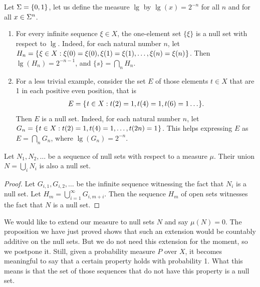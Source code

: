 \begin{examples}\label{example:null-set}
Let \( \Sigma=\{0,1\} \), let us define the measure \( \lg \) by
\( \lg(x)=2^{-n} \) for all \( n \) and for all \( x\in\Sigma^{n} \).
  \begin{enumerate}
  \item\label{i:singleton}
For every infinite sequence \( \xi\in X \), the one-element set \( \{\xi\} \) is a null set
with respect to \( \lg \).
Indeed, for each natural number \( n \), let
\( H_{n}=\mathopen\{\mskip 1mu\xi\in X: \xi(0)=\xi(0),\xi(1)=\xi(1),\dots,\xi(n)=\xi(n)\mskip 1mu\mathclose\} \).
Then \( \lg(H_{n})=2^{-n-1} \), and \( \{s\}=\bigcap_{n}H_{n} \).
\item\label{i:even-places}
For a less trivial example,
consider the set \( E \) of those elements \( t\in X \) that are 1 in each positive even
position, that is
 \begin{align*}
   E=\mathopen\{\mskip 1mu t\in X: t(2)=1,t(4)=1,t(6)=1\dots\mskip 1mu\mathclose\}.
 \end{align*}
Then \( E \) is a null set.
Indeed, for each natural number \( n \), let
\( G_{n}=\mathopen\{\mskip 1mu t\in X: t(2)=1,t(4)=1,\dots,t(2n)=1\mskip 1mu\mathclose\} \).
This helps expressing \( E \) as \( E=\bigcap_{n}G_{n} \), where \( \lg(G_{n})=2^{-n} \).
  \end{enumerate}
\end{examples}

\begin{proposition}\label{propo:infin-null-sets}
  \leanok
Let \( N_{1},N_{2},\dots \) be a sequence of null sets with respect to a measure
\( \mu \).
Their union \( N=\bigcup_{i}N_{i} \) is also a null set.
\end{proposition}
\begin{proof}
  \leanok
  Let \( G_{i,1},G_{i,2},\dots \) be the infinite sequence witnessing the fact that
\( N_{i} \) is a null set.
Let \( H_{m}=\bigcup_{i=1}^{\infty} G_{i,m+i} \).
Then the sequence \( H_{m} \) of open sets witnesses the fact that \( N \) is a null set.
\end{proof}

We would like to extend our measure to null sets \( N \) and say \( \mu(N)=0 \).
The proposition we have just proved shows that such an extension would be
countably additive on the null sets.
But we do not need this extension for the moment, so we postpone it.
Still, given a probability measure \( P \) over \( X \), it becomes meaningful to say
that a certain property holds with probability 1.
What this means is that the set of those sequences that do not have this
property is a null set.

